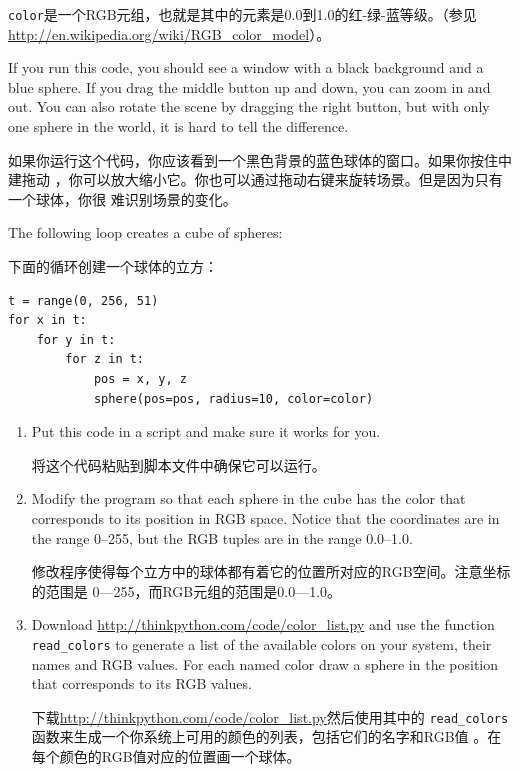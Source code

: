 \documentclass[10pt]{book}
\begin{document}
\begin{CJK}{UTF8}{gbsn}
\begin{exercise}
{\tt color}是一个RGB元组，也就是其中的元素是0.0到1.0的红-绿-蓝等级。（参见
\url{http://en.wikipedia.org/wiki/RGB_color_model}）。

If you run this code, you should see a window with a black
background and a blue sphere.  If you drag the middle button
up and down, you can zoom in and out.  You can also rotate
the scene by dragging the right button, but with only one
sphere in the world, it is hard to tell the difference.

如果你运行这个代码，你应该看到一个黑色背景的蓝色球体的窗口。如果你按住中建拖动
，你可以放大缩小它。你也可以通过拖动右键来旋转场景。但是因为只有一个球体，你很
难识别场景的变化。

The following loop creates a cube of spheres:

下面的循环创建一个球体的立方：

\begin{verbatim}
t = range(0, 256, 51)
for x in t:
    for y in t:
        for z in t:
            pos = x, y, z
            sphere(pos=pos, radius=10, color=color)
\end{verbatim}

\begin{enumerate}

\item Put this code in a script and make sure it works for
you.

将这个代码粘贴到脚本文件中确保它可以运行。

\item Modify the program so that each sphere in the cube
has the color that corresponds to its position in RGB space.
Notice that the coordinates are in the range 0--255, but
the RGB tuples are in the range 0.0--1.0.

修改程序使得每个立方中的球体都有着它的位置所对应的RGB空间。注意坐标的范围是
0---255，而RGB元组的范围是0.0---1.0。

\item Download \url{http://thinkpython.com/code/color_list.py}
and use the function \verb"read_colors" to generate a list
of the available colors on your system, their names and
RGB values.  For each named color draw a sphere in the
position that corresponds to its RGB values.

下载\url{http://thinkpython.com/code/color_list.py}然后使用其中的
\verb"read_colors"函数来生成一个你系统上可用的颜色的列表，包括它们的名字和RGB值
。在每个颜色的RGB值对应的位置画一个球体。


\end{enumerate}


\end{exercise}
\end{CJK}
\end{document}
